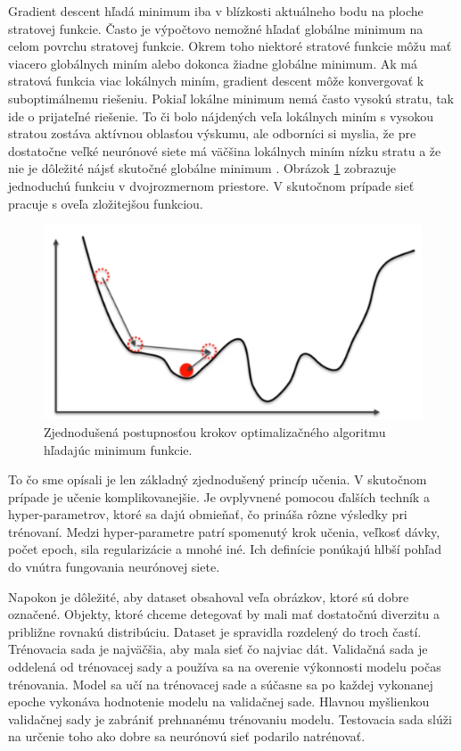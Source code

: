 Gradient descent hľadá minimum iba v blízkosti aktuálneho bodu na ploche stratovej funkcie. Často je výpočtovo nemožné hľadať globálne minimum na celom povrchu stratovej funkcie. Okrem toho niektoré stratové funkcie môžu mať viacero globálnych miním alebo dokonca žiadne globálne minimum. Ak má stratová funkcia viac lokálnych miním, gradient descent môže konvergovať k suboptimálnemu riešeniu. Pokiaľ lokálne minimum nemá často vysokú stratu, tak ide o prijateľné riešenie. To či bolo nájdených veľa lokálnych miním s vysokou stratou zostáva aktívnou oblasťou výskumu, ale odborníci si myslia, že pre dostatočne veľké neurónové siete má väčšina lokálnych miním nízku stratu a že nie je dôležité nájsť skutočné globálne minimum \cite{Goodfellow-et-al-2016}. Obrázok \ref{img:gradient} zobrazuje jednoduchú funkciu v dvojrozmernom priestore. V skutočnom prípade sieť pracuje s oveľa zložitejšou funkciou.
\\
\begin{figure}[h]
    \centering
    \includegraphics[width=.5\textwidth]{images/02/grad.png}
    \caption{Zjednodušená postupnosťou krokov optimalizačného algoritmu hľadajúc minimum funkcie. \cite{grad}}
    \label{img:gradient}
\end{figure}

To čo sme opísali je len základný zjednodušený princíp učenia. V skutočnom prípade je učenie komplikovanejšie. Je ovplyvnené pomocou ďalších techník a hyper-parametrov, ktoré sa dajú obmieňať, čo prináša rôzne výsledky pri trénovaní. Medzi hyper-parametre patrí spomenutý krok učenia, veľkosť dávky, počet epoch, sila regularizácie a mnohé iné. Ich definície ponúkajú hlbší pohľad do vnútra fungovania neurónovej siete.

Napokon je dôležité, aby dataset obsahoval veľa obrázkov, ktoré sú dobre označené. Objekty, ktoré chceme detegovať by mali mať dostatočnú diverzitu a približne rovnakú distribúciu. Dataset je spravidla rozdelený do troch častí. Trénovacia sada je najväčšia, aby mala sieť čo najviac dát. Validačná sada je oddelená od trénovacej sady a používa sa na overenie výkonnosti modelu počas trénovania. Model sa učí na trénovacej sade a súčasne sa po každej vykonanej epoche vykonáva hodnotenie modelu na validačnej sade. Hlavnou myšlienkou validačnej sady je zabrániť prehnanému trénovaniu modelu. Testovacia sada slúži na určenie toho ako dobre sa neurónovú sieť podarilo natrénovať.

